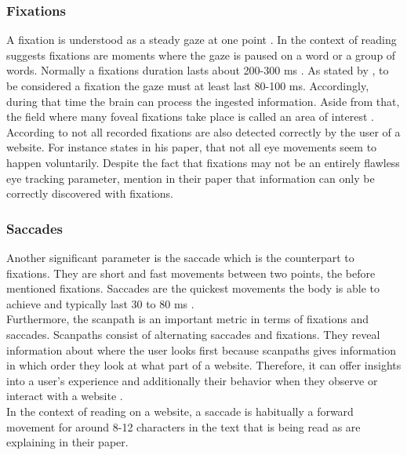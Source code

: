 \subsubsection{Fixations}
A fixation is understood as a steady gaze at one point \autocite[]{buscher2009you}.  In the context of reading \textcite[]{beymer2007eye} suggests fixations are moments where the gaze is paused on a word or a group of words. 
Normally a fixations duration lasts about 200-300 ms \autocite[]{kasneci2015online}. As stated by \textcite[]{buscher2009you}, to be considered a fixation the gaze must at least last 80-100 ms. Accordingly, during that time the brain can process the ingested information. Aside from that, the field where many foveal fixations take place is called an area of interest \autocite[]{djamasbi2014eye}.\\
According to \textcite[]{grzyb2016eye} not all recorded fixations are also detected correctly by the user of a website. For instance \textcite[]{bruneau2002eyes} states in his paper, that not all eye movements seem to happen voluntarily. 
Despite the fact that fixations may not be an entirely flawless eye tracking parameter, \textcite[]{biedert2010eyebook} mention in their paper that information can only be correctly discovered with fixations.

\subsubsection{Saccades}
Another significant parameter is the saccade which is the counterpart to fixations. They are short and fast movements between two points, the before mentioned fixations. Saccades are the quickest movements the body is able to achieve and typically last 30 to 80 ms \autocite[]{blascheck2014state}. \\
Furthermore, the scanpath is an important metric in terms of fixations and saccades. Scanpaths consist of alternating saccades and fixations. They reveal information about where the user looks first because scanpaths gives information in which order they look at what part of a website. Therefore, it can offer insights into a user's experience and additionally their behavior when they observe or interact with a website \autocite[]{lorigo2008eye, blascheck2014state}.\\
In the context of reading on a website, a saccade is habitually a forward movement for around 8-12 characters in the text that is being read as \textcite[]{beymer2007eye} are explaining in their paper.

